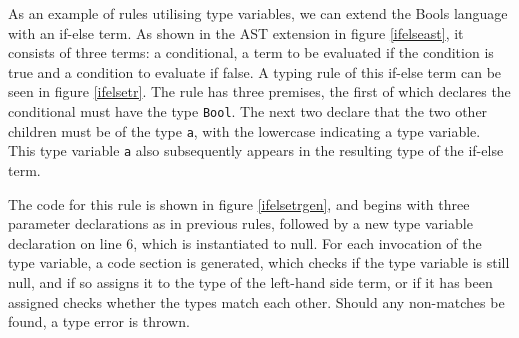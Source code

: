 \documentclass[nofilelist]{cslthse-msc}
\begin{document}
%
As an example of rules utilising type variables, we can extend the Bools language with an if-else term.
As shown in the AST extension in figure \ref{ifelseast}, it consists of three terms: a conditional, a term to be evaluated if the condition is true and a condition to evaluate if false.
A typing rule of this if-else term can be seen in figure \ref{ifelsetr}.
The rule has three premises, the first of which declares the conditional must have the type \verb|Bool|.
The next two declare that the two other children must be of the type \verb|a|, with the lowercase indicating a type variable.
This type variable \verb|a| also subsequently appears in the resulting type of the if-else term.

The code for this rule is shown in figure \ref{ifelsetrgen}, and begins with three parameter declarations as in previous rules, followed by a new type variable declaration on line 6, which is instantiated to null.
For each invocation of the type variable, a code section is generated, which checks if the type variable is still null, and if so assigns it to the type of the left-hand side term, or if it has been assigned checks whether the types match each other. Should any non-matches be found, a type error is thrown.
\end{document}

